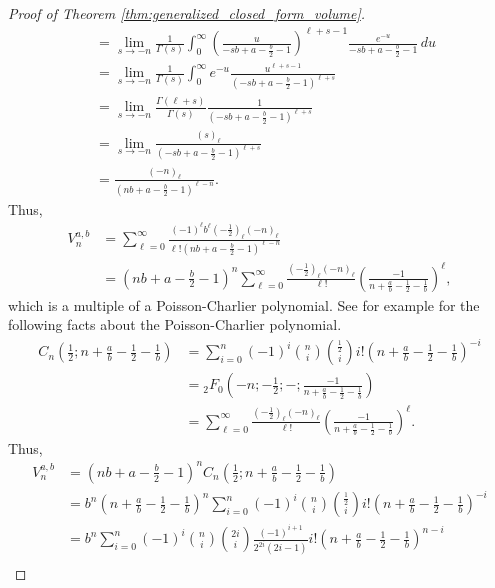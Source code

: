 \documentclass[11pt]{amsart}
\theoremstyle{definition}
\newcommand{\0}{\emptyset}
\begin{document}
\begin{proof}[Proof of Theorem \ref{thm:generalized_closed_form_volume}]
\begin{align*}
    &= \lim_{s \to -n} \frac{1}{\Gamma(s)} \int_0^\infty \left(\frac{u}{-sb+a-\frac{b}{2}-1}\right)^{\ell+s-1} \frac{e^{-u}}{-sb+a-\frac{b}{2} - 1}\, du\\
    &= \lim_{s \to -n} \frac{1}{\Gamma(s)}\int_0^\infty e^{-u} \frac{u^{\ell+s-1}}{(-sb+a-\frac{b}{2}-1)^{\ell+s}}\\
    &= \lim_{s \to -n} \frac{\Gamma(\ell+s)}{\Gamma(s)}\frac{1}{(-sb+a-\frac{b}{2}-1)^{\ell+s}}\\
    &= \lim_{s \to -n} \frac{(s)_{\ell}}{(-sb+a-\frac{b}{2}-1)^{\ell+s}}\\
    &= \frac{(-n)_{\ell}}{(nb+a-\frac{b}{2}-1)^{\ell-n}}.
\end{align*}
Thus,
\begin{align*}
    V^{a,b}_n
    &= \sum_{\ell=0}^\infty \frac{(-1)^\ell b^\ell (-\frac{1}{2})_\ell (-n)_\ell}{\ell! (nb+a-\frac{b}{2}-1)^{\ell-n}}\\
    &= (nb+a - \frac{b}{2} -1)^n \sum_{\ell=0}^\infty \frac{(-\frac{1}{2})_\ell (-n)_\ell}{\ell!}\left( \frac{-1}{n+\frac{a}{b}-\frac{1}{2}-\frac{1}{b}}\right)^\ell,
\end{align*}
which is a multiple of a Poisson-Charlier polynomial. See for example \cite{OE} for the following facts about the Poisson-Charlier polynomial. 
\begin{align*}
    C_n\left(\frac{1}{2}; n + \frac{a}{b} - \frac{1}{2} - \frac{1}{b}\right) 
    &= \sum_{i=0}^n(-1)^i \binom{n}{i}\binom{\frac{1}{2}}{i}i!\left(n + \frac{a}{b} - \frac{1}{2} - \frac{1}{b}\right)^{-i}\\
    &= {}_2F_0\left(-n; -\frac{1}2{}; - ; \frac{-1}{n + \frac{a}{b} - \frac{1}{2} - \frac{1}{b}}\right)\\
    &= \sum_{\ell=0}^\infty \frac{ (-\frac{1}{2})_\ell(-n)_\ell}{\ell!} \left( \frac{-1}{n + \frac{a}{b} - \frac{1}{2} - \frac{1}{b}}\right)^\ell.
\end{align*}
Thus,
\begingroup
\allowdisplaybreaks
\begin{align*}
    V^{a,b}_n &= (nb +a - \frac{b}{2}-1)^n C_n \left(\frac{1}{2}; n + \frac{a}{b} - \frac{1}{2} - \frac{1}{b}\right)\\
    &= b^n\left(n +\frac{a}{b} - \frac{1}{2}-\frac{1}{b}\right)^n  \sum_{i=0}^n(-1)^i \binom{n}{i}\binom{\frac{1}{2}}{i}i!\left(n + \frac{a}{b} - \frac{1}{2} - \frac{1}{b}\right)^{-i}\\
    &= b^n \sum_{i=0}^n(-1)^i \binom{n}{i}\binom{2i}{i} \frac{(-1)^{i+1}}{2^{2i}(2i-1)}i!\left(n + \frac{a}{b} - \frac{1}{2} - \frac{1}{b}\right)^{n-i}\\

\end{align*}
\end{proof}
\end{document}
